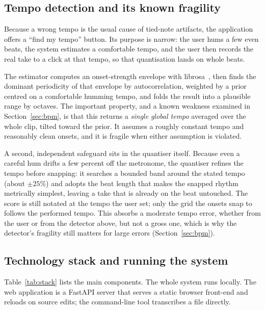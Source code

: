 \documentclass[12pt,a4paper]{article}
\begin{document}
\subsection{Tempo detection and its known fragility}
\label{sec:tempo-design}

Because a wrong tempo is the usual cause of tied-note artifacts, the
application offers a ``find my tempo'' button. Its purpose is narrow: the user
hums a few even beats, the system estimates a comfortable tempo, and the user
then records the real take to a click at that tempo, so that quantisation lands
on whole beats.

The estimator computes an onset-strength envelope with
librosa~\cite{librosa}, then finds the dominant periodicity of that envelope by
autocorrelation, weighted by a prior centred on a comfortable humming tempo,
and folds the result into a plausible range by octaves. The important property,
and a known weakness examined in Section~\ref{sec:bpm}, is that this returns a
\emph{single global tempo} averaged over the whole clip, tilted toward the
prior. It assumes a roughly constant tempo and reasonably clean onsets, and it
is fragile when either assumption is violated.

A second, independent safeguard sits in the quantiser itself. Because even a
careful hum drifts a few percent off the metronome, the quantiser refines the
tempo before snapping: it searches a bounded band around the stated tempo (about
$\pm 25\%$) and adopts the beat length that makes the snapped rhythm metrically
simplest, leaving a take that is already on the beat untouched. The score is
still notated at the tempo the user set; only the grid the onsets snap to follows
the performed tempo. This absorbs a moderate tempo error, whether from the user
or from the detector above, but not a gross one, which is why the detector's
fragility still matters for large errors (Section~\ref{sec:bpm}).

\subsection{Technology stack and running the system}
\label{sec:stack}

Table~\ref{tab:stack} lists the main components. The whole system runs locally.
The web application is a FastAPI server that serves a static browser front-end
and reloads on source edits; the command-line tool transcribes a file directly.
\end{document}
